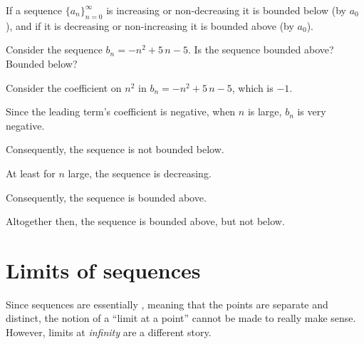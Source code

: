 \documentclass{ximera}
\begin{document}
If a sequence $
\{a_n\}_{n=0}^\infty$ is increasing or non-decreasing it is bounded
below (by $ a_0$), and if it is decreasing or non-increasing it is
bounded above (by $ a_0$).

\begin{question}
  Consider the sequence $b_{n} = -n^{2} + 5 \, n - 5$.  Is the sequence bounded above?  Bounded below?

    \begin{hint}
      Consider the coefficient on $n^{2}$ in $b_{n} = -n^{2} + 5 \, n - 5$, which is $-1$.
    \end{hint}
    \begin{hint}
      Since the leading term's coefficient is negative, when $n$ is large, $b_{n}$ is very negative.
    \end{hint}
    \begin{hint}
      Consequently, the sequence is not bounded below.
    \end{hint}
    \begin{hint}
      At least for $n$ large, the sequence is decreasing.
    \end{hint}
    \begin{hint}
      Consequently, the sequence is bounded above.
    \end{hint}
    \begin{hint}
      Altogether then, the sequence is bounded above, but not below.
    \end{hint}

    \begin{multipleChoice}
    \end{multipleChoice}

\end{question}





\section{Limits of sequences}

Since sequences are essentially , meaning that the points
are separate and distinct, the notion of a ``limit at a point'' cannot
be made to really make sense. However, limits at \textit{infinity} are
a different story.
\end{document}
